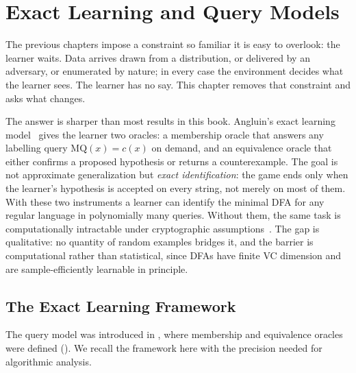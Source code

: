 
\chapter{Exact Learning and Query Models}
\label{ch:exact}

The previous chapters impose a constraint so familiar it is easy to overlook: the learner waits. Data arrives drawn from a distribution, or delivered by an adversary, or enumerated by nature; in every case the environment decides what the learner sees. The learner has no say. This chapter removes that constraint and asks what changes.

The answer is sharper than most results in this book. Angluin's exact learning model~\cite{Angluin1987} gives the learner two oracles: a membership oracle that answers any labelling query $\mathrm{MQ}(x) = c(x)$ on demand, and an equivalence oracle that either confirms a proposed hypothesis or returns a counterexample. The goal is not approximate generalization but \emph{exact identification}: the game ends only when the learner's hypothesis is accepted on every string, not merely on most of them. With these two instruments a learner can identify the minimal DFA for any regular language in polynomially many queries. Without them, the same task is computationally intractable under cryptographic assumptions~\cite{KearnsValiant1994}. The gap is qualitative: no quantity of random examples bridges it, and the barrier is computational rather than statistical, since DFAs have finite VC dimension and are sample-efficiently learnable in principle.


\section{The Exact Learning Framework}
\label{sec:exact-framework}

The query model was introduced in , where membership and equivalence oracles were defined (). We recall the framework here with the precision needed for algorithmic analysis.

